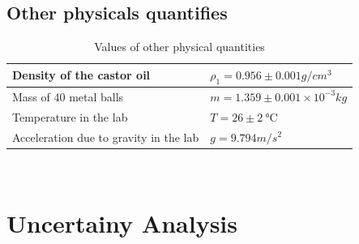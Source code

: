 \documentclass[12pt]{article}
\begin{document}
    \subsection{Other physicals quantifies}
    \begin{table}[htbp]
        \centering
        \begin{tabular}{ll}
            \hline\hline
            Density of the castor oil & $\rho_1=0.956\pm 0.001g/cm^3$\\
            \hline
            Mass of 40 metal balls & $m=1.359\pm 0.001\times10^{-3}kg$\\
            \hline      
            Temperature in the lab & $T=26\pm \SI{2}{\degreeCelsius}$\\
            \hline
            Acceleration due to gravity in the lab & $g=9.794m/s^2$\\        
            \hline\hline
        \end{tabular}\\
        \caption{Values of other physical quantities}
        \label{other}
    \end{table}
    \section{Uncertainy Analysis}
    
\end{document}
